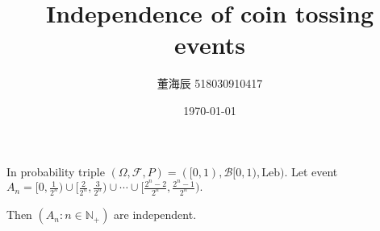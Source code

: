 

\title{Independence of coin tossing events}
\date{\today}
\author{董海辰 518030910417}


\maketitle

\begin{thm}{}{}
    In probability triple $(\Omega , \mathcal{F}, P) = ([0,1),\mathcal{B}[0,1), \mathrm{Leb})$.
    Let event
    \begin{math}
        A_n = [0, \frac{1}{2^n}) \cup [\frac{2}{2^n}, \frac{3}{2^n}) \cup \cdots \cup [\frac{2^n-2}{2^n}, \frac{2^n-1}{2^n})
    .\end{math}

    Then $(A_n: n \in \mathbb{N}_+)$ are independent.
\end{thm}

